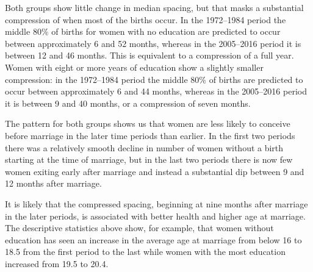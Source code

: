 \documentclass[12pt,letterpaper]{article}
\begin{document}
Both groups show little change in median spacing, but that masks a substantial
compression of when most of the births occur.
In the 1972--1984 period the middle 80\% of births for women with no education 
are predicted to occur between approximately 6 and 52 months, whereas in the 
2005--2016 period it is between 12 and 46 months.
This is equivalent to a compression of a full year.
Women with eight or more years of education show a slightly smaller compression:
in the 1972--1984 period the middle 80\% of births are predicted to occur between
approximately 6 and 44 months, whereas in the 2005--2016 period it is between
9 and 40 months, or a compression of seven months.

The pattern for both groups shows us that women are less likely to conceive 
before marriage in the later time periods than earlier.
In the first two periods there was a relatively smooth decline in number of
women without a birth starting at the time of marriage, but in the last two
periods there is now few women exiting early after marriage and instead a 
substantial dip between 9 and 12 months after marriage.

It is likely that the compressed spacing, beginning at nine months
after marriage in the later periods, is associated with better health
and higher age at marriage.
The descriptive statistics above show, for example, that women without 
education has seen an increase in the average age at marriage from below 
16 to 18.5 from the first period to the last while women with the most 
education increased from 19.5 to 20.4.
\end{document}
